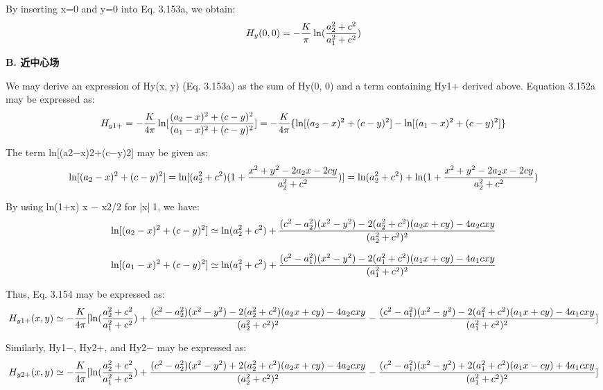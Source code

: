 By inserting x=0 and y=0 into Eq. 3.153a, we obtain:
$$
H_{y}(0,0)=-\frac{K}{\pi}\ln(\frac{a_{2}^{2}+c^{2}}{a_{1}^{2}+c^{2}})\\%
$$

\textbf{B. 近中心场}

We may derive an expression of Hy(x, y) (Eq. 3.153a) as the sum of Hy(0, 0) and
a term containing Hy1+ derived above. Equation 3.152a may be expressed as:
$$H_{y1+}=-\frac{K}{4\pi}\ln[\frac{(a_{2}-x)^{2}+(c-y)^{2}}{(a_{1}-x)^{2}+(c-y)^{2}}]\\
=-\frac{K}{4\pi}\{\ln[(a_{2}-x)^{2}+(c-y)^{2}]-\ln[(a_{1}-x)^{2}+(c-y)^{2}]\}\\%
$$

The term ln[(a2−x)2+(c−y)2] may be given as:
$$
\ln[(a_{2}-x)^{2}+(c-y)^{2}]=\ln[(a_{2}^{2}+c^{2})(1+\frac{x^{2}+y^{2}-2a_{2}x-2cy}{a_{2}^{2}+c^{2}})]\\
=\ln(a_{2}^{2}+c^{2})+\ln(1+\frac{x^{2}+y^{2}-2a_{2}x-2cy}{a_{2}^{2}+c^{2}})\\
$$

By using ln(1+x)  x − x2/2 for |x|1, we have:
$$
\ln[(a_{2}-x)^{2}+(c-y)^{2}]\simeq\ln(a_{2}^{2}+c^{2})\\
+\frac{(c^{2}-a_{2}^{2})(x^{2}-y^{2})-2(a_{2}^{2}+c^{2})(a_{2}x+cy)-4a_{2}cxy}{(a_{2}^{2}+c^{2})^{2}}\\
$$

$$
\ln[(a_{1}-x)^{2}+(c-y)^{2}]\simeq\ln(a_{1}^{2}+c^{2})\\
+\frac{(c^{2}-a_{1}^{2})(x^{2}-y^{2})-2(a_{1}^{2}+c^{2})(a_{1}x+cy)-4a_{1}cxy}{(a_{1}^{2}+c^{2})^{2}}\\
$$

Thus, Eq. 3.154 may be expressed as:
$$
H_{y1+}(x,y)\simeq-\frac{K}{4\pi}[\ln(\frac{a_{2}^{2}+c^{2}}{a_{1}^{2}+c^{2}})+\frac{(c^{2}-a_{2}^{2})(x^{2}-y^{2})-2(a_{2}^{2}+c^{2})(a_{2}x+cy)-4a_{2}cxy}{(a_{2}^{2}+c^{2})^{2}}\\
-\frac{(c^{2}-a_{1}^{2})(x^{2}-y^{2})-2(a_{1}^{2}+c^{2})(a_{1}x+cy)-4a_{1}cxy}{(a_{1}^{2}+c^{2})^{2}}]\\%
$$

Similarly, Hy1−, Hy2+, and Hy2− may be expressed as:
$$H_{y2+}(x,y)\simeq-\frac{K}{4\pi}[\ln(\frac{a_{2}^{2}+c^{2}}{a_{1}^{2}+c^{2}})+\frac{(c^{2}-a_{2}^{2})(x^{2}-y^{2})+2(a_{2}^{2}+c^{2})(a_{2}x+cy)-4a_{2}cxy}{(a_{2}^{2}+c^{2})^{2}}\\
-\frac{(c^{2}-a_{1}^{2})(x^{2}-y^{2})+2(a_{1}^{2}+c^{2})(a_{1}x-cy)+4a_{1}cxy}{(a_{1}^{2}+c^{2})^{2}}]\\%
$$

